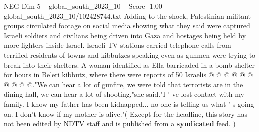 \begin{textsample}{NEG Dim 5 – global\_south\_2023\_10 – Score -1.00 – global\_south\_2023\_10/102428744.txt}
Adding to the shock, Palestinian militant groups circulated footage on social media showing what they said were captured Israeli soldiers and civilians being driven into Gaza and hostages being held by more fighters inside Israel.
Israeli TV stations carried telephone calls from terrified residents of towns and kibbutzes speaking even as gunmen were trying to break into their shelters.
A woman identified as Ella barricaded in a bomb shelter for hours in Be'eri kibbutz, where there were reports of 50 Israelis @ @ @ @ @ @ @ @ @ @."We can hear a lot of gunfire, we were told that terrorists are in the dining hall, we can hear a lot of shooting,"she said."I ' ve lost contact with my family.
I know my father has been kidnapped... no one is telling us what ' s going on.
I don't know if my mother is alive."( Except for the headline, this story has not been edited by NDTV staff and is published from a \textbf{syndicated} feed. )

\end{textsample}
